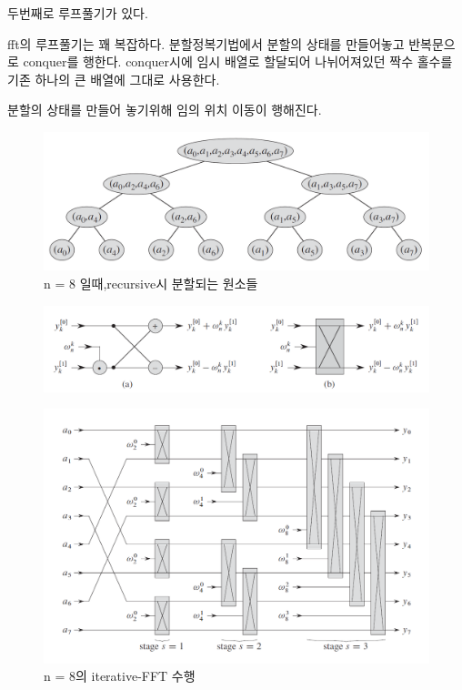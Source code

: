 \documentclass{oblivoir}
\begin{document}
두번째로 루프풀기가 있다.

fft의 루프풀기는 꽤 복잡하다.
분할정복기법에서 분할의 상태를 만들어놓고 반복문으로 conquer를 행한다.
conquer시에 임시 배열로 할달되어 나뉘어져있던 짝수 홀수를 기존 하나의 큰 배열에 그대로 사용한다.


분할의 상태를 만들어 놓기위해 임의 위치 이동이 행해진다.


\begin{figure}[h!]
    \centering
    \includegraphics[scale=0.4]{pic3.PNG}
    \caption{n = 8 일때,recursive시 분할되는 원소들}
\end{figure}

\begin{figure}[h!]
    \centering
    \includegraphics[scale=0.5]{pic4.PNG}
\end{figure}


\begin{figure}[h!]
    \centering
    \includegraphics[scale=0.5]{pic5.PNG}
    \caption{n = 8의 iterative-FFT 수행}
\end{figure}
\end{document}
